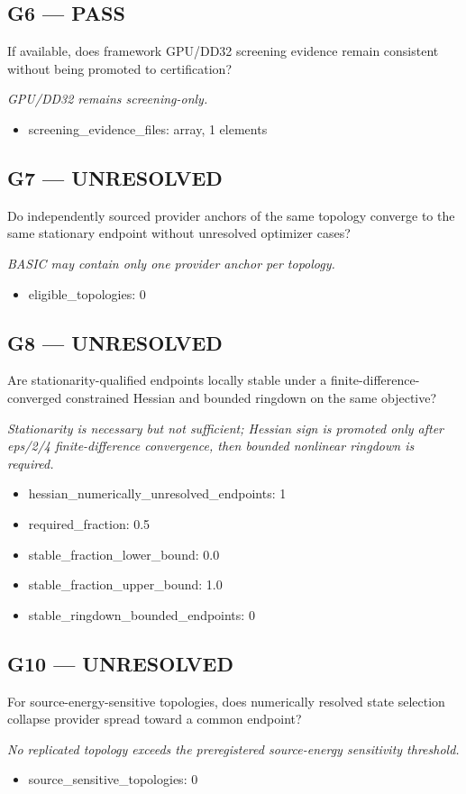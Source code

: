 \documentclass[10pt,a4paper]{article}
\begin{document}
\subsection*{G6 --- PASS}
If available, does framework GPU/DD32 screening evidence remain consistent without being promoted to certification?
\par\textit{GPU/DD32 remains screening-only.}\par
\begin{itemize}
\item screening\_evidence\_files: array, 1 elements
\end{itemize}
\subsection*{G7 --- UNRESOLVED}
Do independently sourced provider anchors of the same topology converge to the same stationary endpoint without unresolved optimizer cases?
\par\textit{BASIC may contain only one provider anchor per topology.}\par
\begin{itemize}
\item eligible\_topologies: 0
\end{itemize}
\subsection*{G8 --- UNRESOLVED}
Are stationarity-qualified endpoints locally stable under a finite-difference-converged constrained Hessian and bounded ringdown on the same objective?
\par\textit{Stationarity is necessary but not sufficient; Hessian sign is promoted only after eps/2/4 finite-difference convergence, then bounded nonlinear ringdown is required.}\par
\begin{itemize}
\item hessian\_numerically\_unresolved\_endpoints: 1
\item required\_fraction: 0.5
\item stable\_fraction\_lower\_bound: 0.0
\item stable\_fraction\_upper\_bound: 1.0
\item stable\_ringdown\_bounded\_endpoints: 0
\end{itemize}
\subsection*{G10 --- UNRESOLVED}
For source-energy-sensitive topologies, does numerically resolved state selection collapse provider spread toward a common endpoint?
\par\textit{No replicated topology exceeds the preregistered source-energy sensitivity threshold.}\par
\begin{itemize}
\item source\_sensitive\_topologies: 0
\end{itemize}
\end{document}
